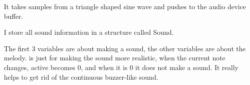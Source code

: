 \documentclass[letterpaper,10pt,english]{sphinxmanual}
\begin{document}
\begin{sphinxVerbatim}[commandchars=\\\{\}]
      
        
           
        \PYG{p}{[}\PYG{p}{]}    
\end{sphinxVerbatim}

It takes samples from a triangle shaped sine wave and pushes to the audio device buffer.

I store all sound information in a structure called Sound.

\begin{sphinxVerbatim}[commandchars=\\\{\}]
 
   
   
   
   
   
   \PYG{p}{[}\PYG{p}{]}
   
   
\end{sphinxVerbatim}

The first 3 variables are about making a sound, the other variables are about the melody.
 is just for making the sound more realistic, when the current note changes,
active becomes 0, and when it is 0 it does not make a sound. It really helps to get rid of
the continuous buzzer-like sound.
\end{document}
